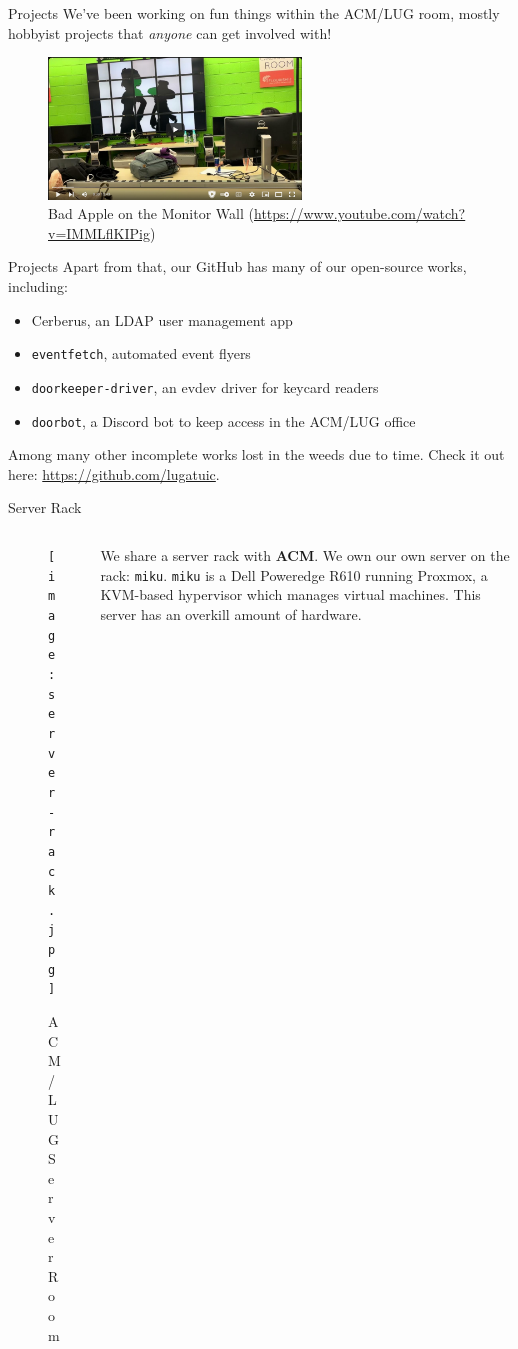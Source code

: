 \documentclass{beamer}
\begin{document}
\begin{frame}{Projects}
	We've been working on fun things within the ACM/LUG room, mostly
	hobbyist projects that \textit{anyone} can get involved with!
	\pause
	\begin{figure}
		\centering
		\includegraphics[width=0.60\textwidth]{bad-apple.png}
		\caption{Bad Apple on the Monitor Wall
		(\url{https://www.youtube.com/watch?v=IMMLflKIPig})}
	\end{figure}
\end{frame}

\begin{frame}{Projects}
	Apart from that, our GitHub has many of our open-source works, including:
	\pause
	\begin{itemize}
		\item Cerberus, an LDAP user management app
			\pause
		\item \texttt{eventfetch}, automated event flyers
			\pause
		\item \texttt{doorkeeper-driver}, an evdev driver for keycard readers
			\pause
		\item \texttt{doorbot}, a Discord bot to keep access in the ACM/LUG office
			\pause
	\end{itemize}
	Among many other incomplete works lost in the weeds due to time. Check it
	out here: \url{https://github.com/lugatuic}.
\end{frame}

\begin{frame}{Server Rack}
	\begin{columns}
		\begin{column}{0.4\textwidth}
			\begin{figure}
				\centering
				\texttt{[image: server-rack.jpg]}
				\caption{ACM/LUG Server Room}
			\end{figure}
		\end{column}
		\begin{column}{0.6\textwidth}
			We share a server rack with \textbf{ACM}. \pause We own
			our own server on the rack: \texttt{miku}.
			\texttt{miku} is a Dell Poweredge R610 running Proxmox,
			a KVM-based hypervisor which manages virtual machines.
			This server has an overkill amount of hardware.
		\end{column}
	\end{columns}
\end{frame}
\end{document}
